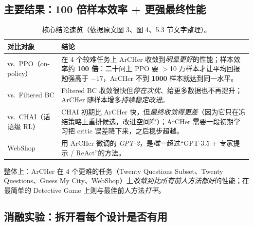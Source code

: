 \documentclass[11pt,UTF8,fontset=fandol]{ctexart}
\begin{document}
\subsection{主要结果：100 倍样本效率 + 更强最终性能}

\begin{table}[H]\centering\caption{核心结论速览（依据原文图 3、图 4、5.3 节文字整理）。}
\begin{tabular}{@{}p{4.2cm}p{10.5cm}@{}}
\toprule
\textbf{对比对象} & \textbf{结论} \\ \midrule
vs.\ PPO（on-policy） & 在 4 个较难任务上 ArCHer 收敛到\emph{明显更好}的性能；样本效率约 \textbf{100 倍}：二十问上 PPO 要 $>$10 万样本才让平均回报勉强高于 $-17$，ArCHer 不到 \textbf{1000} 样本就达到同一水平。 \\
vs.\ Filtered BC & Filtered BC 收敛很快但\emph{停在次优}、给更多数据也不再提升；ArCHer 随样本增多\emph{持续稳定改进}。 \\
vs.\ CHAI（话语级 RL） & CHAI 初期比 ArCHer 快，但\emph{最终收敛得更差}（因为它只在冻结策略上重排候选，改进空间窄）；ArCHer 需要一段初期学习把 critic 误差降下来，之后稳步超越。 \\
WebShop & 用 ArCHer 微调的 \emph{GPT-2}，是\emph{唯一}超过“GPT-3.5 + 专家提示 / ReAct”的方法。 \\
\bottomrule
\end{tabular}
\end{table}

整体上：ArCHer 在 4 个更难的任务（Twenty Questions Subset、Twenty Questions、Guess My City、WebShop）上\emph{收敛到比所有前人方法都好}的性能；在最简单的 Detective Game 上则与最佳前人方法\emph{打平}。

\subsection{消融实验：拆开看每个设计是否有用}
\end{document}
